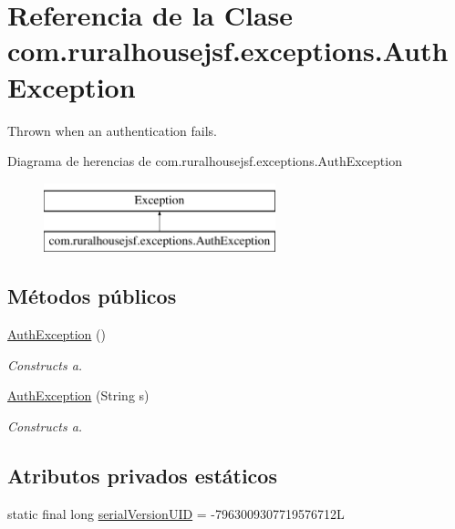 \hypertarget{classcom_1_1ruralhousejsf_1_1exceptions_1_1_auth_exception}{}\section{Referencia de la Clase com.\+ruralhousejsf.\+exceptions.\+Auth\+Exception}
\label{classcom_1_1ruralhousejsf_1_1exceptions_1_1_auth_exception}


Thrown when an authentication fails.  


Diagrama de herencias de com.\+ruralhousejsf.\+exceptions.\+Auth\+Exception\begin{figure}[H]
\begin{center}
\leavevmode
\includegraphics[height=2.000000cm]{d3/d6c/classcom_1_1ruralhousejsf_1_1exceptions_1_1_auth_exception}
\end{center}
\end{figure}
\subsection*{Métodos públicos}
\begin{DoxyCompactItemize}
\item 
\mbox{\hyperlink{classcom_1_1ruralhousejsf_1_1exceptions_1_1_auth_exception_a092e5eb20bddab6f6741d8a04c7f05a2}{Auth\+Exception}} ()
\begin{DoxyCompactList}\small\item\em Constructs a. \end{DoxyCompactList}\item 
\mbox{\hyperlink{classcom_1_1ruralhousejsf_1_1exceptions_1_1_auth_exception_ac4b5a1b9673da9a2de397154017a0c1e}{Auth\+Exception}} (String s)
\begin{DoxyCompactList}\small\item\em Constructs a. \end{DoxyCompactList}\end{DoxyCompactItemize}
\subsection*{Atributos privados estáticos}
\begin{DoxyCompactItemize}
\item 
static final long \mbox{\hyperlink{classcom_1_1ruralhousejsf_1_1exceptions_1_1_auth_exception_a0bda3b553296d4340933a563b323bb5f}{serial\+Version\+U\+ID}} = -\/7963009307719576712L
\end{DoxyCompactItemize}


